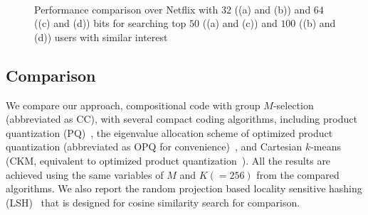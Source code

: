 \documentclass[10pt, letterpaper]{article}
\begin{document}
\begin{figure}[t]
\centering
{}~
~
~
\vspace{-0.3cm}
\caption{Performance comparison over Netflix with $32$ ((a) and (b)) and $64$ ((c) and (d)) bits
for searching top $50$ ((a) and (c)) and $100$ ((b) and (d)) users with similar interest}
\label{fig:NetflixResultsComparison}\vspace{-0.3cm}
\end{figure}


\subsection{Comparison}
We compare our approach,
compositional code with group $M$-selection (abbreviated as CC),
with several compact coding algorithms,
including product quantization (PQ)~\cite{JegouDS11},
the eigenvalue allocation scheme of optimized product quantization (abbreviated as OPQ for convenience)~\cite{GeHK013},
and Cartesian $k$-means~\cite{NorouziF13}
(CKM,
equivalent to optimized product quantization~\cite{GeHK013}).
All the results are achieved
using the same variables of $M$ and $K(=256)$
from the compared algorithms.
We also report the random projection based locality sensitive hashing
(LSH)~\cite{DatarIIM04} that is designed for cosine similarity search
for comparison.
\end{document}
